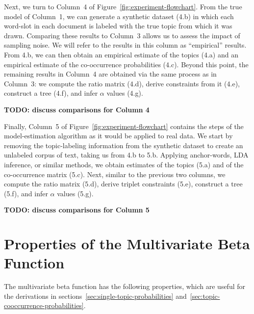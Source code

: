 \documentclass{article}
\theoremstyle{definition}
\begin{document}
Next, we turn to Column~4 of Figure~\ref{fig:experiment-flowchart}.
From the true model of Column~1, we can generate a synthetic dataset (4.b) in which each word-slot in each document is labeled with the true topic from which it was drawn.
Comparing these results to Column~3 allows us to assess the impact of sampling noise.
We will refer to the results in this column as ``empirical'' results.
From 4.b, we can then obtain an empirical estimate of the topics (4.a) and an empirical estimate of the co-occurrence probabilities (4.c).
Beyond this point, the remaining results in Column~4 are obtained via the same process as in Column~3: we compute the ratio matrix (4.d), derive constraints from it (4.e), construct a tree (4.f), and infer $\alpha$ values (4.g).

{\bf TODO: discuss comparisons for Column 4}

Finally, Column~5 of Figure~\ref{fig:experiment-flowchart} contains the steps of the model-estimation algorithm as it would be applied to real data.
We start by removing the topic-labeling information from the synthetic dataset to create an unlabeled corpus of text, taking us from 4.b to 5.b.
Applying anchor-words, LDA inference, or similar methods, we obtain estimates of the topics (5.a) and of the co-occurrence matrix (5.c).
Next, similar to the previous two columns, we compute the ratio matrix (5.d), derive triplet constraints (5.e), construct a tree (5.f), and infer $\alpha$ values (5.g).

{\bf TODO: discuss comparisons for Column 5}

\clearpage
\appendix
\section{Properties of the Multivariate Beta Function}

The multivariate beta function has the following properties, which are useful for the derivations in sections~\ref{sec:single-topic-probabilities} and~\ref{sec:topic-cooccurrence-probabilities}.
\end{document}
